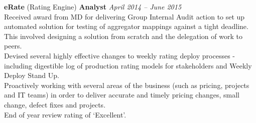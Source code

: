 \documentclass[11pt]{article}
\begin{document}
\begin{description}
\textbf{eRate} (Rating Engine) \textbf{Analyst} \emph{April 2014 -- June 2015}\\
\textbullet \quad Received award from MD for delivering Group Internal Audit action to set up automated solution for testing of aggregator mappings against a tight deadline. This involved designing a solution from scratch and the delegation of work to peers.\\
\textbullet \quad Devised several highly effective changes to weekly rating deploy processes - including digestible log of production rating models for stakeholders and Weekly Deploy Stand Up. \\
\textbullet \quad Proactively working with several areas of the business (such as pricing, projects and IT teams) in order to deliver accurate and timely pricing changes, small change, defect fixes and projects.\\
\textbullet \quad End of year review rating of `Excellent'.
\end{description}
\end{document}
